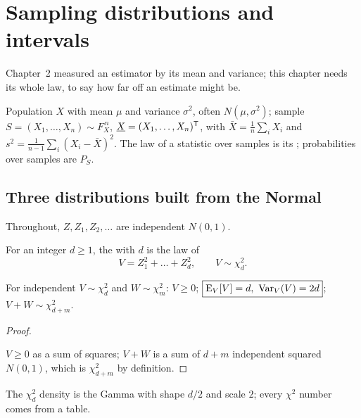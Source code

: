 \chapter{Sampling distributions and intervals}

Chapter~2 measured an estimator by its mean and variance; this chapter needs its whole law, to say how far off an estimate might be.

\begin{setup}
Population $X$ with mean $\mu$ and variance $\sigma^2$, often $N(\mu,\sigma^2)$; sample $S=(X_1,\dots,X_n)\sim F_X^{\,n}$, $\underline{X}=(X_1,\dots,X_n)^{\mathsf{T}}$, with $\bar X=\frac1n\sum_iX_i$ and $s^2=\frac1{n-1}\sum_i(X_i-\bar X)^2$. The law of a statistic over samples is its ; probabilities over samples are $P_S$.
\end{setup}

\section{Three distributions built from the Normal}

Throughout, $Z,Z_1,Z_2,\dots$ are independent $N(0,1)$.

\begin{definition}
For an integer $d\ge1$, the  with $d$  is the law of
\[
  \boxed{\;V=Z_1^2+\dots+Z_d^2,\qquad V\sim\chi^2_d.\;}
\]
\end{definition}

\begin{result}
For independent $V\sim\chi^2_d$ and $W\sim\chi^2_m$: $V\ge0$; $\boxed{\operatorname{E}_V[V]=d,\ \operatorname{Var}_V(V)=2d}$; $V+W\sim\chi^2_{d+m}$.
\end{result}
\begin{proof}
\begin{deriv}
\end{deriv}
$V\ge0$ as a sum of squares; $V+W$ is a sum of $d+m$ independent squared $N(0,1)$, which is $\chi^2_{d+m}$ by definition.
\end{proof}

The $\chi^2_d$ density is the Gamma with shape $d/2$ and scale $2$; every $\chi^2$ number comes from a table.

